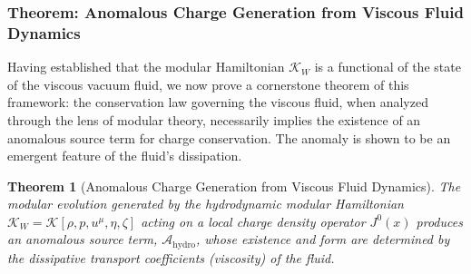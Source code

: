 \documentclass[11pt, letterpaper]{report}
\theoremstyle{plain} %
\newtheorem{theorem}{Theorem}[chapter]
\theoremstyle{definition} %
\theoremstyle{remark} %
\newcommand{\ModularK}{\mathcal{K}}
\begin{document}
\subsubsection{Theorem: Anomalous Charge Generation from Viscous Fluid Dynamics}
\label{subsec:anomaly_from_viscosity}

Having established that the modular Hamiltonian $\ModularK_W$ is a functional of the state of the viscous vacuum fluid, we now prove a cornerstone theorem of this framework: the conservation law governing the viscous fluid, when analyzed through the lens of modular theory, necessarily implies the existence of an anomalous source term for charge conservation. The anomaly is shown to be an emergent feature of the fluid's dissipation.

\begin{theorem}[Anomalous Charge Generation from Viscous Fluid Dynamics]
\label{thm:anomaly_from_hydro}
The modular evolution generated by the hydrodynamic modular Hamiltonian $\ModularK_W = \mathcal{K}[\rho, p, u^\mu, \eta, \zeta]$ acting on a local charge density operator $J^0(x)$ produces an anomalous source term, $\mathcal{A}_{\text{hydro}}$, whose existence and form are determined by the dissipative transport coefficients (viscosity) of the fluid.
\end{theorem}
\end{document}
